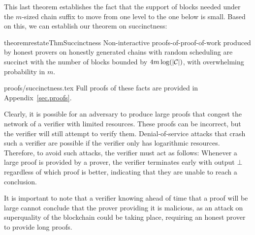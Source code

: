 This last theorem establishes the fact that the support of blocks needed under
the $m$-sized chain suffix to move from one level to the one below is small.
Based on this, we can establish our theorem on succinctness:

\begin{restatable}{theorem}{restateThmSuccinctness}
    \label{thm.succinctness}
    Non-interactive proofs-of-proof-of-work produced by honest provers on
    honestly generated chains with random scheduling are succinct with the
    number of blocks bounded by $4m \log(|\mathcal{C}|)$, with overwhelming
    probability in $m$.
\end{restatable}

\ifonecolumn
{proofs/succinctness.tex}
\else
Full proofs of these facts are provided in Appendix~\ref{sec.proofs}.
\fi

\begin{remark}
Clearly, it is possible for an adversary to produce large proofs that congest
the network of a verifier with limited resources. These proofs can be incorrect,
but the verifier will still attempt to verify them. Denial-of-service attacks
that crash such a verifier are possible if the verifier only has logarithmic
resources. Therefore, to avoid such attacks, the verifier must act as follows:
Whenever a large proof is provided by a prover, the verifier terminates early
with output $\bot$ regardless of which proof is better, indicating that they are
unable to reach a conclusion.


It is important to note that a verifier knowing ahead of time that a proof will
be large cannot conclude that the prover providing it is malicious, as an attack
on superquality of the blockchain could be taking place, requiring an honest
prover to provide long proofs.
\end{remark}
